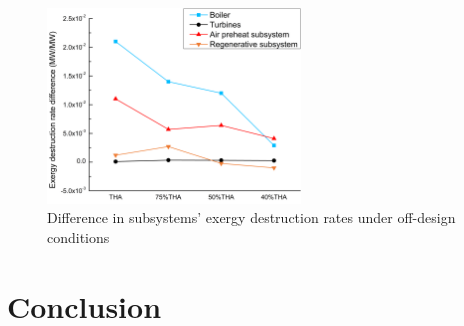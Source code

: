 \documentclass[preprint,12pt]{elsarticle}
\begin{document}
\begin{figure}[htbp]
\centering
\includegraphics[width=0.6\textwidth]{fig/partload_subsys_exergyrate.png}
\caption{Difference in subsystems' exergy destruction rates under off-design conditions} 
\label{fig:partload_subsys_exergyrate}
\end{figure}


\section{Conclusion}
\end{document}

